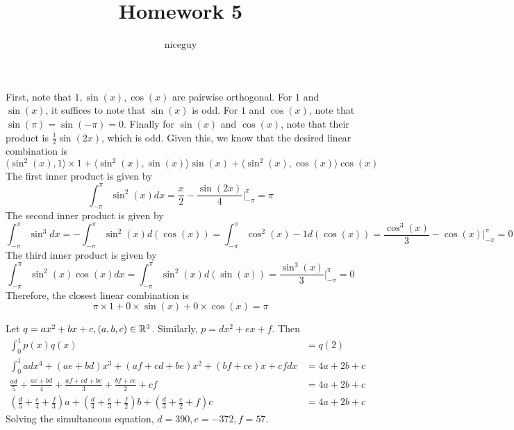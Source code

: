\documentclass[answers]{exam}
\author{niceguy}
\title{Homework 5}
\begin{document}
\maketitle

\begin{questions}


\begin{solution}
	First, note that $1, \sin(x), \cos(x)$ are pairwise orthogonal. For $1$ and $\sin(x)$, it suffices to note that $\sin(x)$ is odd. For $1$ and $\cos(x)$, note that $\sin(\pi) = \sin(-\pi) = 0$. Finally for $\sin(x)$ and $\cos(x)$, note that their product is $\frac{1}{2}\sin(2x)$, which is odd. Given this, we know that the desired linear combination is
	$$\langle \sin^2(x),1 \rangle \times 1 + \langle \sin^2(x), \sin(x) \rangle \sin(x) + \langle \sin^2(x),\cos(x) \rangle \cos(x)$$
	The first inner product is given by
	$$\int_{-\pi}^\pi \sin^2(x)dx = \frac{x}{2} - \frac{\sin(2x)}{4} \Big |_{-\pi}^\pi = \pi$$
	The second inner product is given by
	$$\int_{-\pi}^\pi \sin^3dx = -\int_{-\pi}^\pi \sin^2(x)d(\cos(x)) = \int_{-\pi}^\pi \cos^2(x) - 1 d(\cos(x)) = \frac{\cos^3(x)}{3} - \cos(x) \Big |_{-\pi}^\pi = 0$$
	The third inner product is given by
	$$\int_{-\pi}^\pi \sin^2(x)\cos(x) dx = \int_{-\pi}^\pi \sin^2(x) d(\sin(x)) = \frac{\sin^3(x)}{3} \Big |_{-\pi}^\pi = 0$$
	Therefore, the closest linear combination is
	$$\pi \times 1 + 0 \times \sin(x) + 0 \times \cos(x) = \pi$$
\end{solution}


\begin{solution}
	Let $q = ax^2 + bx + c, (a,b,c) \in \mathbb{R}^3$. Similarly, $p = dx^2 + ex + f$. Then
	\begin{align*}
		\int_0^1 p(x)q(x) &= q(2) \\
		\int_0^1 adx^4 + (ae + bd)x^3 + (af + cd + be)x^2 + (bf + ce)x + cf dx &= 4a + 2b + c \\
		\frac{ad}{5} + \frac{ae+bd}{4} + \frac{af + cd + be}{3} + \frac{bf + ce}{2} + cf &= 4a + 2b + c \\
		\left(\frac{d}{5} + \frac{e}{4} + \frac{f}{3}\right)a + \left(\frac{d}{4} + \frac{e}{3} + \frac{f}{2}\right)b + \left(\frac{d}{3} + \frac{e}{2} + f\right)c &= 4a + 2b + c
	\end{align*}
	Solving the simultaneous equation, $d=390,e=-372,f=57$.
\end{solution}


\end{questions}
\end{document}
